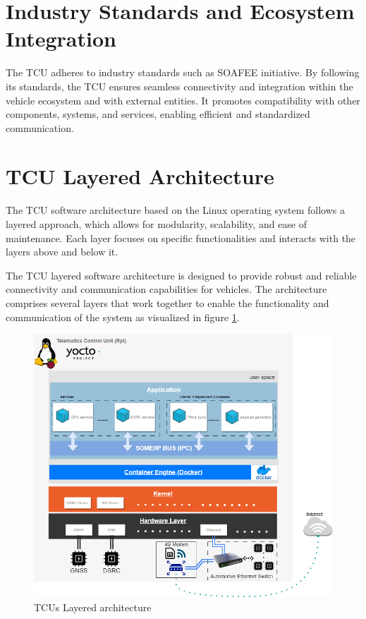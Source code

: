 \documentclass[
12pt,
oneside, 
onehalfspacing, 
nolistspacing, 
parskip, 
chapterinoneline, 
]{AASTCOMPUTER}
\begin{document}
\section{Industry Standards and Ecosystem Integration}
The TCU adheres to industry standards such as SOAFEE initiative. By following its standards, the TCU ensures seamless connectivity and integration within the vehicle ecosystem and with external entities. It promotes compatibility with other components, systems, and services, enabling efficient and standardized communication.

\section{TCU Layered Architecture}



The TCU software architecture based on the Linux operating system follows a layered approach, which allows for modularity, scalability, and ease of maintenance. Each layer focuses on specific functionalities and interacts with the layers above and below it.

The TCU layered software architecture is designed to provide robust and reliable connectivity and communication capabilities for vehicles. The architecture comprises several layers that work together to enable the functionality and communication of the system as visualized in figure \ref{fig:TCUs Layered architecture}.
\clearpage

\begin{figure}[h]
\centering
\includegraphics[scale=0.5]{Figures/TCUs Layered architecture.png}
\caption[TCUs Layered architecture]{TCUs Layered architecture}
\label{fig:TCUs Layered architecture}
\end{figure}
\end{document}
